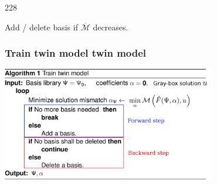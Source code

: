 \documentclass{beamer}
\newcommand{\barrow}{\item[\color{darkred}\ding{228}]}
\begin{document}
\begin{frame}
\begin{columns}
\begin{center}
                \end{center}
            \end{columns}
    \begin{dinglist}{228}
        \barrow Add / delete basis if $\overline{\mathcal{M}}$ decreases.
    \end{dinglist}
\end{frame}

\begin{frame}
    \frametitle{Train twin model \hfill \scriptsize{twin model}}\small
    \begin{center}
        \includegraphics[height=5cm]{algo1.png}
    \end{center}
\end{frame}
\end{document}
